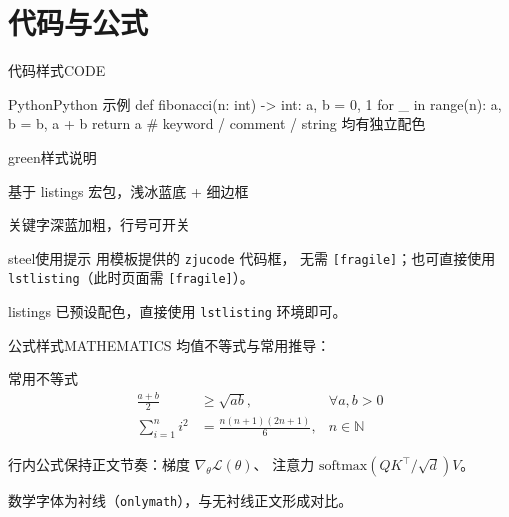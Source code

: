 \documentclass[10pt,aspectratio=169]{beamer}
\begin{document}
\section{代码与公式}

\begin{frame}[fragile]{代码样式}{CODE}
  \begin{zjucode}{Python}{Python 示例}
def fibonacci(n: int) -> int:
    a, b = 0, 1
    for _ in range(n):
        a, b = b, a + b
    return a
# keyword / comment / string 均有独立配色
  \end{zjucode}
  \vspace{0.4mm}
  \begin{minipage}[t]{0.475\textwidth}
    \vspace{0pt}%
    \begin{zjubox}{green}{样式说明}
      {\footnotesize
      \begin{denseitem}
        \item 基于 listings 宏包，浅冰蓝底 + 细边框
        \item 关键字深蓝加粗，行号可开关
      \end{denseitem}}
    \end{zjubox}
  \end{minipage}\hfill
  \begin{minipage}[t]{0.475\textwidth}
    \vspace{0pt}%
    \begin{zjubox}{steel}{使用提示}
      {\footnotesize 用模板提供的 \texttt{zjucode} 代码框，
      无需 \texttt{[fragile]}；也可直接使用
      \texttt{lstlisting}（此时页面需 \texttt{[fragile]}）。}
    \end{zjubox}
  \end{minipage}
  \begin{takeaway}
    listings 已预设配色，直接使用 \texttt{lstlisting} 环境即可。
  \end{takeaway}
\end{frame}

\begin{frame}{公式样式}{MATHEMATICS}
  均值不等式与常用推导：
  \begin{block}{常用不等式}
    \vspace{-1.5mm}
    \begin{align}
      \frac{a+b}{2} &\geq \sqrt{ab},
      & \forall a,b>0 \\
      \sum_{i=1}^{n} i^2 &= \frac{n(n+1)(2n+1)}{6},
      & n \in \mathbb{N}
    \end{align}
  \end{block}
  \vspace{0.5mm}
  行内公式保持正文节奏：梯度 $\nabla_\theta \mathcal{L}(\theta)$、
  注意力 $\mathrm{softmax}(QK^{\top}/\sqrt{d})V$。
  \begin{takeaway}
    数学字体为衬线（\texttt{onlymath}），与无衬线正文形成对比。
  \end{takeaway}
\end{frame}



\begin{frame}[plain]
  \zjuthanks
\end{frame}
\end{document}
